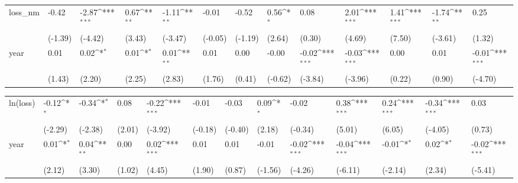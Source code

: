 \def\sym#1{\ifmmode^{#1}\else\(^{#1}\)\fi}
\begin{tabular}{p{1.5cm} p{1.7cm} p{1.7cm} p{1.7cm}  p{1.7cm} p{1.7cm} p{1.7cm} p{1.7cm} p{1.7cm}  p{1.7cm} p{1.7cm} p{1.7cm} p{1.7cm} }
\hline
loss\_nm         &    -0.42         &    -2.87\sym{***}&     0.67\sym{**} &    -1.11\sym{**} &    -0.01         &    -0.52         &     0.56\sym{*}  &     0.08         &     2.01\sym{***}&     1.41\sym{***}&    -1.74\sym{**} &     0.25         \\
                &  (-1.39)         &  (-4.42)         &   (3.43)         &  (-3.47)         &  (-0.05)         &  (-1.19)         &   (2.64)         &   (0.30)         &   (4.69)         &   (7.50)         &  (-3.61)         &   (1.32)         \\
year            &     0.01         &     0.02\sym{*}  &     0.01\sym{*}  &     0.01\sym{**} &     0.01         &     0.00         &    -0.00         &    -0.02\sym{***}&    -0.03\sym{***}&     0.00         &     0.01         &    -0.01\sym{***}\\
                &   (1.43)         &   (2.20)         &   (2.25)         &   (2.83)         &   (1.76)         &   (0.41)         &  (-0.62)         &  (-3.84)         &  (-3.96)         &   (0.22)         &   (0.90)         &  (-4.70)         \\
\end{tabular}
\def\sym#1{\ifmmode^{#1}\else\(^{#1}\)\fi}
\begin{tabular}{p{1.5cm} p{1.7cm} p{1.7cm} p{1.7cm}  p{1.7cm} p{1.7cm} p{1.7cm} p{1.7cm} p{1.7cm}  p{1.7cm} p{1.7cm} p{1.7cm} p{1.7cm} }
\hline
ln(loss)        &    -0.12\sym{*}  &    -0.34\sym{*}  &     0.08         &    -0.22\sym{***}&    -0.01         &    -0.03         &     0.09\sym{*}  &    -0.02         &     0.38\sym{***}&     0.24\sym{***}&    -0.34\sym{***}&     0.03         \\
                &  (-2.29)         &  (-2.38)         &   (2.01)         &  (-3.92)         &  (-0.18)         &  (-0.40)         &   (2.18)         &  (-0.34)         &   (5.01)         &   (6.05)         &  (-4.05)         &   (0.73)         \\
year            &     0.01\sym{*}  &     0.04\sym{**} &     0.00         &     0.02\sym{***}&     0.01         &     0.01         &    -0.01         &    -0.02\sym{***}&    -0.04\sym{***}&    -0.01\sym{*}  &     0.02\sym{*}  &    -0.02\sym{***}\\
                &   (2.12)         &   (3.30)         &   (1.02)         &   (4.45)         &   (1.90)         &   (0.87)         &  (-1.56)         &  (-4.26)         &  (-6.11)         &  (-2.14)         &   (2.34)         &  (-5.41)         \\
\end{tabular}
